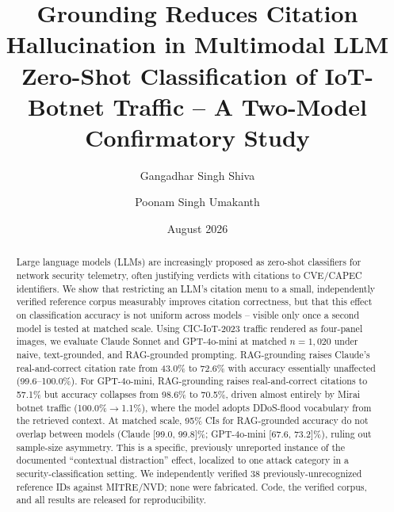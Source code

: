 \documentclass[twocolumn]{svjour3}
\begin{document}
\title{Grounding Reduces Citation Hallucination in Multimodal LLM
Zero-Shot Classification of IoT-Botnet Traffic --
A Two-Model Confirmatory Study}

\author{Gangadhar Singh Shiva \and Poonam Singh Umakanth}


\date{August 2026}


\maketitle
\sloppy

\begin{abstract}
Large language models (LLMs) are increasingly proposed as zero-shot classifiers for network
security telemetry, often justifying verdicts with citations to CVE\slash CAPEC identifiers. We show
that restricting an LLM's citation menu to a small, independently verified reference corpus
measurably improves citation correctness, but that this effect on classification accuracy is not
uniform across models -- visible only once a second model is tested at matched scale. Using
CIC-IoT-2023 traffic rendered as four-panel images, we evaluate Claude Sonnet and GPT-4o-mini at
matched $n=1{,}020$ under naive, text-grounded, and RAG-grounded prompting. RAG-grounding raises
Claude's real-and-correct citation rate from 43.0\% to 72.6\% with accuracy essentially unaffected
(99.6--100.0\%). For GPT-4o-mini, RAG-grounding raises real-and-correct citations to 57.1\% but
accuracy collapses from 98.6\% to 70.5\%, driven almost entirely by Mirai botnet traffic
(100.0\%$\to$1.1\%), where the model adopts DDoS-flood vocabulary from the retrieved context. At
matched scale, 95\% CIs for RAG-grounded accuracy do not overlap between models (Claude
[99.0, 99.8]\%; GPT-4o-mini [67.6, 73.2]\%), ruling out sample-size asymmetry. This is a specific,
previously unreported instance of the documented ``contextual distraction'' effect, localized to
one attack category in a security-classification setting. We independently verified 38
previously-unrecognized reference IDs against MITRE\slash NVD; none were fabricated. Code, the verified
corpus, and all results are released for reproducibility.

\end{abstract}
\end{document}
